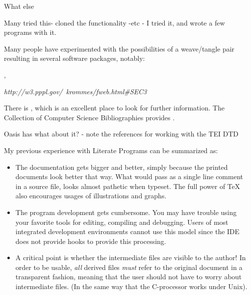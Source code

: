 \textsf{What else}

\textsf{Many tried this- cloned the functionality -etc - I tried it,
  and wrote a few programs with it.}

Many people have experimented with the possibilities of a
weave/tangle pair resulting in several software packages, notably:

,

\textit{http://w3.pppl.gov/~krommes/fweb.html\#SEC3}

There is
, which is an excellent place to
look for further information.  The Collection of Computer Science
Bibliographies provides
.

Oasis has  \textsf{what about
  it? - note the references for working with the TEI DTD}

My previous experience with Literate Programs can be summarized as:

\begin{itemize}
\item The documentation gets bigger and better, simply because the
printed documents look better that way.  What would pass as a single
line comment in a source file, looks almost pathetic when typeset.
The full power of {\TeX} also encourages usages of illustrations and
graphs.  

\item The program development gets cumbersome.  You may have trouble
  using your favorite tools for editing, compiling and debugging.
  Users of most integrated development environments cannot use this
  model since the IDE does not provide hooks to provide this processing.
  
\item A critical point is whether the intermediate files are visible
  to the author! In order to be usable, \textit{all} derived files
  \textit{must} refer to the original document in a transparent
  fashion, meaning that the user should not have to worry about
  intermediate files.  (In the same way that the C-processor works
  under Unix).
\end{itemize}

